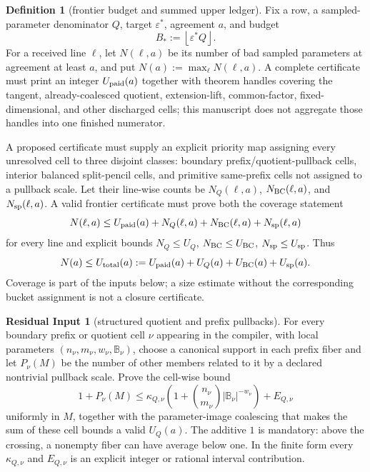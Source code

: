 \documentclass[11pt]{article}
\theoremstyle{definition}
\newtheorem{definition}[definition]{Definition}
\newtheorem{residualinput}[residualinput]{Residual Input}
\theoremstyle{remark}
\newcommand{\B}{\mathbb{B}}
\providecommand{\floor}[1]{\left\lfloor #1\right\rfloor}
\begin{document}
\begin{definition}[frontier budget and summed upper ledger]\label{def:capg-frontier-ledger}
Fix a row, a sampled-parameter denominator $Q$, target $\varepsilon^*$, agreement $a$, and budget
\[
        B_*:=\floor{\varepsilon^*Q}.
\]
For a received line $\ell$, let $N(\ell,a)$ be its number of bad sampled parameters at agreement at least $a$, and put $N(a):=\max_\ell N(\ell,a)$.  A complete certificate must print an integer $U_{\rm paid}(a)$ together with theorem handles covering the tangent, already-coalesced quotient, extension-lift, common-factor, fixed-dimensional, and other discharged cells; this manuscript does not aggregate those handles into one finished numerator.

A proposed certificate must supply an explicit priority map assigning every unresolved cell to three disjoint classes: boundary prefix/quotient-pullback cells, interior balanced split-pencil cells, and primitive same-prefix cells not assigned to a pullback scale.  Let their line-wise counts be $N_Q(\ell,a)$, $N_{\rm BC}(\ell,a)$, and $N_{\rm sp}(\ell,a)$.  A valid frontier certificate must prove both the coverage statement
\[
        N(\ell,a)\le U_{\rm paid}(a)+N_Q(\ell,a)+N_{\rm BC}(\ell,a)+N_{\rm sp}(\ell,a)
\]
for every line and explicit bounds $N_Q\le U_Q$, $N_{\rm BC}\le U_{\rm BC}$, $N_{\rm sp}\le U_{\rm sp}$.  Thus
\[
        N(a)\le U_{\rm total}(a):=
        U_{\rm paid}(a)+U_Q(a)+U_{\rm BC}(a)+U_{\rm sp}(a).
\]
Coverage is part of the inputs below; a size estimate without the corresponding bucket assignment is not a closure certificate.
\end{definition}

\begin{residualinput}[structured quotient and prefix pullbacks]\label{prob:capg-active-Q}
For every boundary prefix or quotient cell $\nu$ appearing in the compiler, with local parameters $(n_\nu,m_\nu,w_\nu,\B_\nu)$, choose a canonical support in each prefix fiber and let $P_\nu(M)$ be the number of other members related to it by a declared nontrivial pullback scale.  Prove the cell-wise bound
\[
        1+P_\nu(M)
        \le
        \kappa_{Q,\nu}
        \left(1+\binom{n_\nu}{m_\nu}|\B_\nu|^{-w_\nu}\right)
        +E_{Q,\nu}
\]
uniformly in $M$, together with the parameter-image coalescing that makes the sum of these cell bounds a valid $U_Q(a)$.  The additive $1$ is mandatory: above the crossing, a nonempty fiber can have average below one.  In the finite form every $\kappa_{Q,\nu}$ and $E_{Q,\nu}$ is an explicit integer or rational interval contribution.
\end{residualinput}
\end{document}
